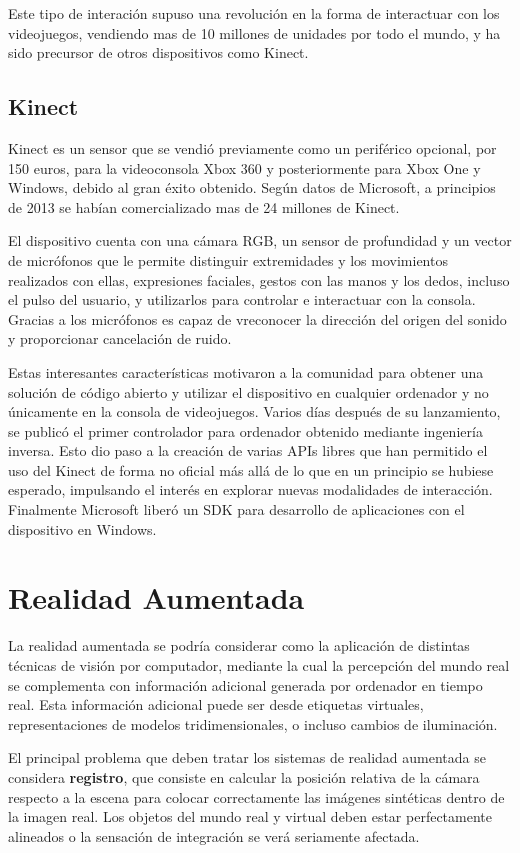 Este tipo de interación supuso una revolución en la forma de interactuar con los videojuegos, vendiendo mas de 10 millones de unidades por todo el mundo, y ha sido precursor de otros dispositivos como Kinect.

\subsection{Kinect}
Kinect es un sensor que se vendió previamente como un periférico opcional, por 150 euros, para la videoconsola Xbox 360 y posteriormente para Xbox One y Windows, debido al gran éxito obtenido. Según datos de Microsoft, a principios de 2013 se habían comercializado mas de 24 millones de Kinect. 

El dispositivo cuenta con una cámara RGB, un sensor de profundidad y un vector de micrófonos que le permite distinguir extremidades y los movimientos realizados con ellas, expresiones faciales, gestos con las manos y los dedos, incluso el pulso del usuario, y utilizarlos para controlar e interactuar con la consola. Gracias a los micrófonos es capaz de  vreconocer la dirección del origen del sonido y proporcionar cancelación de ruido.

Estas interesantes características motivaron a la comunidad para obtener una solución de código abierto y utilizar el dispositivo en cualquier ordenador y no únicamente en la consola de videojuegos. Varios días después de su lanzamiento, se publicó el primer controlador para ordenador obtenido mediante ingeniería inversa. Esto dio paso a la creación de varias APIs libres que han permitido el uso del Kinect de forma no oficial más allá de lo que en un principio se hubiese esperado, impulsando el interés en explorar nuevas modalidades de interacción. Finalmente Microsoft liberó un SDK para desarrollo de aplicaciones con el dispositivo en Windows.  

\section{Realidad Aumentada}
La realidad aumentada se podría considerar como la aplicación de distintas técnicas de visión por computador, mediante la cual la percepción del mundo real se complementa con información adicional generada por ordenador en tiempo real. Esta información adicional puede ser desde etiquetas virtuales, representaciones de modelos tridimensionales, o incluso cambios de iluminación. 

El principal problema que deben tratar los sistemas de realidad aumentada se considera \textbf{registro}, que consiste en calcular la posición relativa de la cámara respecto a la escena para colocar correctamente las imágenes sintéticas dentro de la imagen real. Los objetos del mundo real y virtual deben estar perfectamente alineados o la sensación de integración se verá seriamente afectada.

